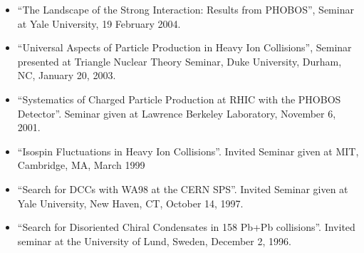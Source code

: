 \documentclass[11 pt]{article}
\begin{document}
\begin{description}
\begin{itemize}
\item ``The Landscape of the Strong Interaction: Results from PHOBOS'', Seminar at Yale University, 19 February 2004.
\item ``Universal Aspects of Particle Production in Heavy Ion Collisions'', Seminar presented at Triangle Nuclear Theory Seminar, Duke University, Durham, NC, January 20, 2003.
\item ``Systematics of Charged Particle Production at RHIC with the PHOBOS Detector''.  Seminar given at Lawrence Berkeley Laboratory, November 6, 2001.
\item ``Isospin Fluctuations in Heavy Ion Collisions''.  Invited Seminar given at MIT, Cambridge, MA, March 1999
\item ``Search for DCCs with WA98 at the CERN SPS''.  Invited Seminar given at Yale University, New Haven, CT, October 14, 1997.
\item ``Search for Disoriented Chiral Condensates in 158 Pb+Pb collisions''.  Invited seminar at the University of Lund, Sweden, December 2, 1996. 
\end{itemize}


\end{description}
\end{document}
